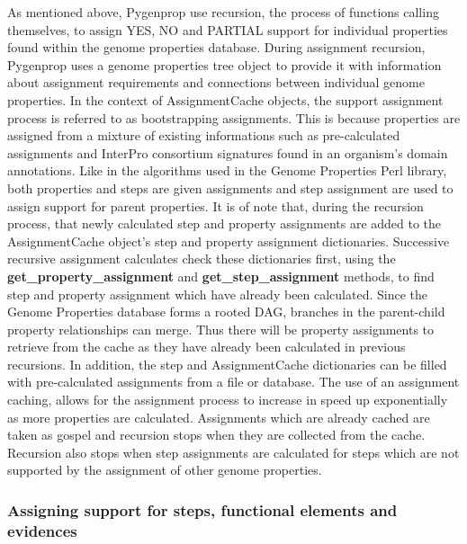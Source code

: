 As mentioned above, Pygenprop use recursion, the process of functions calling themselves, to assign YES, NO and PARTIAL support for individual properties found within the genome properties database. During assignment recursion, Pygenprop uses a genome properties tree object to provide it with information about assignment requirements and connections between individual genome properties. In the context of AssignmentCache objects, the support assignment process is referred to as bootstrapping assignments. This is because properties are assigned from a mixture of existing informations such as pre-calculated assignments and InterPro consortium signatures found in an organism's domain annotations. Like in the algorithms used in the Genome Properties Perl library, both properties and steps are given assignments and step assignment are used to assign support for parent properties. It is of note that, during the recursion process, that newly calculated step and property assignments are added to the AssignmentCache object's step and property assignment dictionaries. Successive recursive assignment calculates check these dictionaries first, using the \textbf{get\_property\_assignment} and \textbf{get\_step\_assignment} methods, to find step and property assignment which have already been calculated. Since the Genome Properties database forms a rooted DAG, branches in the parent-child property relationships can merge. Thus there will be property assignments to retrieve from the cache as they have already been calculated in previous recursions. In addition, the step and AssignmentCache dictionaries can be filled with pre-calculated assignments from a file or database. The use of an assignment caching, allows for the assignment process to increase in speed up exponentially as more properties are calculated. Assignments which are already cached are taken as gospel and recursion stops when they are collected from the cache. Recursion also stops when step assignments are calculated for steps which are not supported by the assignment of other genome properties. 

\subsubsection{Assigning support for steps, functional elements and evidences}

